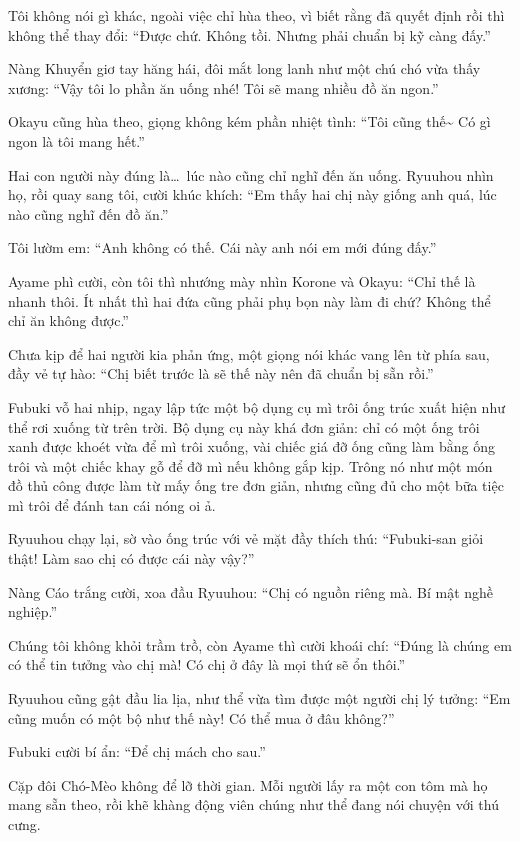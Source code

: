 \documentclass[../main.tex]{subfiles}
\begin{document}
Tôi không nói gì khác, ngoài việc chỉ hùa theo, vì biết rằng đã quyết định rồi thì không thể thay đổi: ``Được chứ. Không tồi. Nhưng phải chuẩn bị kỹ càng đấy.''


Nàng Khuyển giơ tay hăng hái, đôi mắt long lanh như một chú chó vừa thấy xương: ``Vậy tôi lo phần ăn uống nhé! Tôi sẽ mang nhiều đồ ăn ngon.''

Okayu cũng hùa theo, giọng không kém phần nhiệt tình: ``Tôi cũng thế\~{} Có gì ngon là tôi mang hết.''

Hai con người này đúng là\dots\ lúc nào cũng chỉ nghĩ đến ăn uống. Ryuuhou nhìn họ, rồi quay sang tôi, cười khúc khích: ``Em thấy hai chị này giống anh quá, lúc nào cũng nghĩ đến đồ ăn.''

Tôi lườm em: ``Anh không có thế. Cái này anh nói em mới đúng đấy.''

Ayame phì cười, còn tôi thì nhướng mày nhìn Korone và Okayu: ``Chỉ thế là nhanh thôi. Ít nhất thì hai đứa cũng phải phụ bọn này làm đi chứ? Không thể chỉ ăn không được.''

Chưa kịp để hai người kia phản ứng, một giọng nói khác vang lên từ phía sau, đầy vẻ tự hào: ``Chị biết trước là sẽ thế này nên đã chuẩn bị sẵn rồi.''

Fubuki vỗ hai nhịp, ngay lập tức một bộ dụng cụ mì trôi ống trúc xuất hiện như thể rơi xuống từ trên trời. Bộ dụng cụ này khá đơn giản: chỉ có một ống trôi xanh được khoét vừa để mì trôi xuống, vài chiếc giá đỡ ống cũng làm bằng ống trôi và một chiếc khay gỗ để đỡ mì nếu không gắp kịp. Trông nó như một món đồ thủ công được làm từ mấy ống tre đơn giản, nhưng cũng đủ cho một bữa tiệc mì trôi để đánh tan cái nóng oi ả.

Ryuuhou chạy lại, sờ vào ống trúc với vẻ mặt đầy thích thú: ``Fubuki-san giỏi thật! Làm sao chị có được cái này vậy?''

Nàng Cáo trắng cười, xoa đầu Ryuuhou: ``Chị có nguồn riêng mà. Bí mật nghề nghiệp.''

Chúng tôi không khỏi trầm trồ, còn Ayame thì cười khoái chí: ``Đúng là chúng em có thể tin tưởng vào chị mà! Có chị ở đây là mọi thứ sẽ ổn thôi.''

Ryuuhou cũng gật đầu lia lịa, như thể vừa tìm được một người chị lý tưởng: ``Em cũng muốn có một bộ như thế này! Có thể mua ở đâu không?''

Fubuki cười bí ẩn: ``Để chị mách cho sau.''

Cặp đôi Chó-Mèo không để lỡ thời gian. Mỗi người lấy ra một con tôm mà họ mang sẵn theo, rồi khẽ khàng động viên chúng như thể đang nói chuyện với thú cưng.
\end{document}
